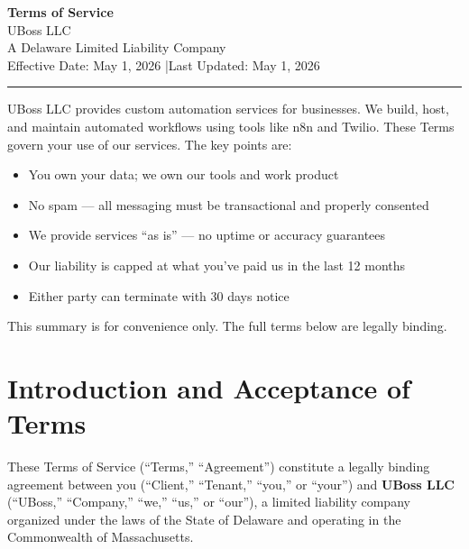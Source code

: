 \documentclass[11pt,letterpaper,parskip=half]{scrartcl}
\begin{document}
\begin{center}
    {\LARGE\bfseries\color{charcoal}Terms of Service}\\[0.4em]
    {\large\color{accent}UBoss LLC}\\[0.3em]
    {\small A Delaware Limited Liability Company}\\[0.2em]
    {\small Effective Date: May 1, 2026 \quad|\quad Last Updated: May 1, 2026}\\[0.5em]
    \textcolor{ruleline}{\rule{0.5\textwidth}{0.6pt}}
\end{center}

\vspace{0.5em}

\begin{tcolorbox}[keyterm, title={Plain-Language Summary}]
UBoss LLC provides custom automation services for businesses. We build, host, and maintain automated workflows using tools like n8n and Twilio. These Terms govern your use of our services. The key points are:
\begin{itemize}[nosep, leftmargin=1.5em]
    \item You own your data; we own our tools and work product
    \item No spam --- all messaging must be transactional and properly consented
    \item We provide services ``as is'' --- no uptime or accuracy guarantees
    \item Our liability is capped at what you've paid us in the last 12 months
    \item Either party can terminate with 30 days notice
\end{itemize}
This summary is for convenience only. The full terms below are legally binding.
\end{tcolorbox}

\vspace{0.5em}
\tableofcontents
\newpage

\section{Introduction and Acceptance of Terms}

These Terms of Service (``Terms,'' ``Agreement'') constitute a legally binding agreement between you (``Client,'' ``Tenant,'' ``you,'' or ``your'') and \textbf{UBoss LLC} (``UBoss,'' ``Company,'' ``we,'' ``us,'' or ``our''), a limited liability company organized under the laws of the State of Delaware and operating in the Commonwealth of Massachusetts.
\end{document}
